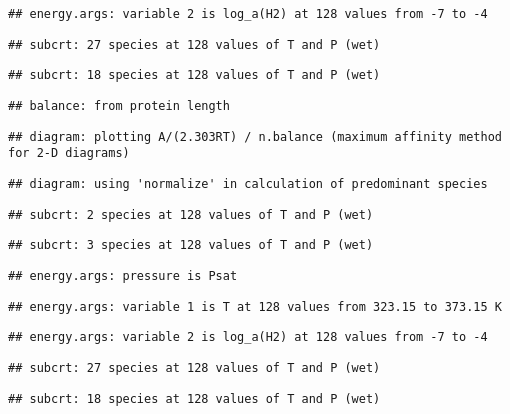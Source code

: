 \documentclass[]{article}
\begin{document}
\begin{verbatim}
## energy.args: variable 2 is log_a(H2) at 128 values from -7 to -4
\end{verbatim}

\begin{verbatim}
## subcrt: 27 species at 128 values of T and P (wet)
\end{verbatim}

\begin{verbatim}
## subcrt: 18 species at 128 values of T and P (wet)
\end{verbatim}

\begin{verbatim}
## balance: from protein length
\end{verbatim}

\begin{verbatim}
## diagram: plotting A/(2.303RT) / n.balance (maximum affinity method for 2-D diagrams)
\end{verbatim}

\begin{verbatim}
## diagram: using 'normalize' in calculation of predominant species
\end{verbatim}

\begin{verbatim}
## subcrt: 2 species at 128 values of T and P (wet)
\end{verbatim}

\begin{verbatim}
## subcrt: 3 species at 128 values of T and P (wet)
\end{verbatim}

\begin{verbatim}
## energy.args: pressure is Psat
\end{verbatim}

\begin{verbatim}
## energy.args: variable 1 is T at 128 values from 323.15 to 373.15 K
\end{verbatim}

\begin{verbatim}
## energy.args: variable 2 is log_a(H2) at 128 values from -7 to -4
\end{verbatim}

\begin{verbatim}
## subcrt: 27 species at 128 values of T and P (wet)
\end{verbatim}

\begin{verbatim}
## subcrt: 18 species at 128 values of T and P (wet)
\end{verbatim}
\end{document}
